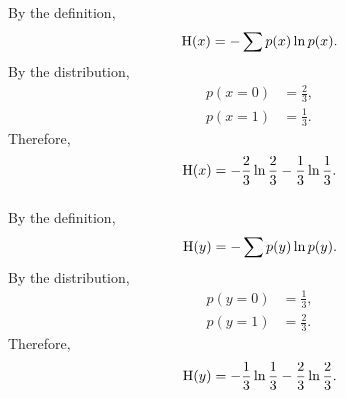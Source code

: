 \subsubsection{}
By the definition,
%
\begin{equation}
{\rm H}(x) = - \sum p(x) \ln p(x).
\end{equation}
%
By the distribution,
%
\begin{equation}
\begin{aligned}
p(x = 0) &= \frac{2}{3}, \\
p(x = 1) &= \frac{1}{3}.
\end{aligned}
\end{equation}
%
Therefore,
%
\begin{equation}
{\rm H}(x) = - \frac{2}{3} \ln \frac{2}{3} - \frac{1}{3} \ln \frac{1}{3}.
\end{equation}
%


\subsubsection{}
By the definition,
%
\begin{equation}
{\rm H}(y) = - \sum p(y) \ln p(y).
\end{equation}
%
By the distribution,
%
\begin{equation}
\begin{aligned}
p(y = 0) &= \frac{1}{3}, \\
p(y = 1) &= \frac{2}{3}.
\end{aligned}
\end{equation}
%
Therefore,
%
\begin{equation}
{\rm H}(y) = - \frac{1}{3} \ln \frac{1}{3} - \frac{2}{3} \ln \frac{2}{3}.
\end{equation}
%


